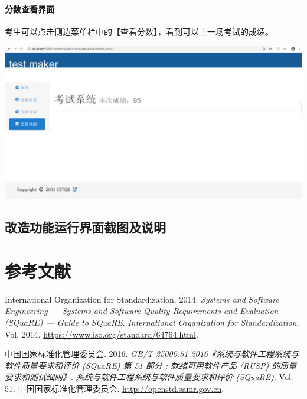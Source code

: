 \documentclass[hyperref, a4paper]{ctexart}
\let\oldparagraph\paragraph
\renewcommand{\paragraph}[1]{\oldparagraph{#1}\mbox{}}
\begin{document}
\hypertarget{ux5206ux6570ux67e5ux770bux754cux9762}{%
\paragraph{分数查看界面}\label{ux5206ux6570ux67e5ux770bux754cux9762}}

考生可以点击侧边菜单栏中的【查看分数】，看到可以上一场考试的成绩。

\includegraphics{pics/student_score.jpeg}

\hypertarget{ux6539ux9020ux529fux80fdux8fd0ux884cux754cux9762ux622aux56feux53caux8bf4ux660e}{%
\subsection{改造功能运行界面截图及说明}\label{ux6539ux9020ux529fux80fdux8fd0ux884cux754cux9762ux622aux56feux53caux8bf4ux660e}}

\pagebreak

\hypertarget{ux53c2ux8003ux6587ux732e}{%
\section*{参考文献}\label{ux53c2ux8003ux6587ux732e}}

\hypertarget{refs}{}
\leavevmode\hypertarget{ref-innovativeInternationalisation}{}%
International Organization for Standardization. 2014. \emph{Systems and
Software Engineering --- Systems and Software Quality Requirements and
Evaluation (SQuaRE) --- Guide to SQuaRE}. \emph{International
Organization for Standardization}. Vol. 2014.
\url{https://www.iso.org/standard/64764.html}.

\leavevmode\hypertarget{ref-innovative1}{}%
中国国家标准化管理委员会. 2016. \emph{GB/T
25000.51-2016《系统与软件工程系统与软件质量要求和评价 (SQuaRE) 第 51
部分 : 就绪可用软件产品 (RUSP) 的质量要求和测试细则》}.
\emph{系统与软件工程系统与软件质量要求和评价 (SQuaRE)}. Vol. 51.
中国国家标准化管理委员会. \url{http://openstd.samr.gov.cn}.
\end{document}

